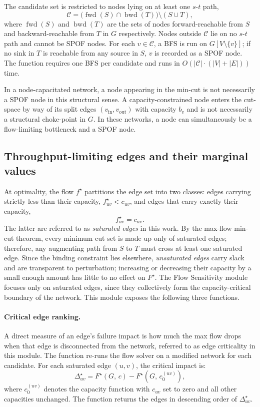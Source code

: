 \documentclass[12pt]{report}
\begin{document}
The candidate set is restricted to nodes lying on at least one $s$-$t$ path,
\[
\mathcal{C} = \bigl(\operatorname{fwd}(S) \cap 
\operatorname{bwd}(T)\bigr) \setminus (S \cup T),
\]
where $\operatorname{fwd}(S)$ and $\operatorname{bwd}(T)$ are the sets of nodes forward-reachable from $S$ and backward-reachable from $T$ in $G$ respectively. Nodes outside $\mathcal{C}$ lie on no $s$-$t$ path and cannot be SPOF nodes. For each $v \in \mathcal{C}$, a BFS is run on $G[V \setminus \{v\}]$; if no sink in $T$ is reachable from any source in $S$, $v$ is recorded as a SPOF node. The function requires one BFS per candidate and runs in $O(|\mathcal{C}| \cdot (|V| + |E|))$ time. 

In a node-capacitated network, a node appearing in the min-cut is not necessarily a SPOF node in this structural sense. A capacity-constrained node enters the cut-space by way of its split edges $(v_{\text{in}}, v_{\text{out}})$ with capacity $b_v$ and is not necessarily a structural choke-point in $G$. In these networks, a node 
can simultaneously be a flow-limiting bottleneck and a SPOF node.







\subsection{Throughput-limiting edges and their marginal values}
\label{sec:flow-sensitivity}
At optimality, the flow $f^\star$ partitions the edge set into two 
classes: edges carrying strictly less than their capacity, $f^\star_{uv} < c_{uv}$, and edges that carry exactly their capacity,
\[
f^\star_{uv} = c_{uv}.
\]
The latter are referred to as \emph{saturated edges} in this work. By the max-flow min-cut theorem, every minimum cut set is made up only of saturated edges; therefore, any augmenting path from $S$ to $T$ must cross at least one saturated edge. Since the binding constraint lies elsewhere, \emph{unsaturated edges} carry slack and are transparent to perturbation; increasing or decreasing their capacity by a small enough amount has little to no effect on $F^\star$. The Flow Sensitivity module focuses only on saturated edges, since they collectively form the capacity-critical boundary of the network. This module exposes the following three functions.

\paragraph{Critical edge ranking.}
A direct measure of an edge's failure impact is how much the max flow drops when that edge is disconnected from the network, referred to as edge criticality in this module. The function re-runs the flow solver on a modified network for each candidate. For each saturated edge $(u,v)$, the critical impact is:
\[
\Delta^\star_{uv} = F^\star(G,\, c) - 
F^\star\!\left(G,\, c^{(uv)}_0\right),
\]
where $c^{(uv)}_0$ denotes the capacity function with $c_{uv}$ set to zero and all other capacities unchanged. The function returns the edges in descending order of $\Delta^\star_{uv}$. 
\end{document}
